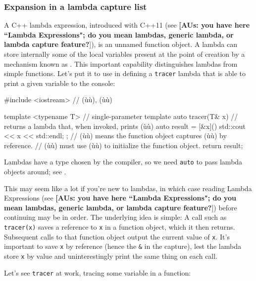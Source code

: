 \subsubsection[Expansion in a lambda capture list]{Expansion in a lambda capture list}\label{expansion-in-a-lambda-capture-list}

A C++ lambda expression, introduced with C++11 (see \featureref{}{}\textbf{[AUs: you have here ``Lambda
Expressions"; do you mean lambdas, generic lambda, or lambda capture feature?}]), is an unnamed function object. A lambda can store
internally some of the local variables present at the point of creation
by a mechanism known as . This important
capability distinguishes lambdas from simple functions. Let's put it to
use in defining a \lstinline!tracer! lambda that is able to print a given
variable to the console:

\begin{emcppslisting}
#include <iostream>  // (ù{}ù), (ù{}ù)

template <typename T>  // single-parameter template
auto tracer(T& x)      // returns a lambda that, when invoked, prints (ù{}ù)
{
    auto result = [&x]() { std::cout << x << std::endl; };
        // (ù{\codeincomments{[\&x]}}ù) means the function object captures (ù{}ù) by reference.
        // (ù{}ù) must use (ù{}ù) to initialize the function object.
    return result;
}
\end{emcppslisting}
    

\noindent Lambdas have a type chosen by the compiler, so we need \lstinline!auto! to
pass lambda objects around; see .

This may seem like a lot if you're new to lambdas, in which case reading
Lambda Expressions (see \featureref{}{}\textbf{[AUs: you have here ``Lambda
Expressions"; do you mean lambdas, generic lambda, or lambda capture feature?}]) before continuing may be in order. The
underlying idea is simple: A call such as \lstinline!tracer(x)! saves a
reference to \lstinline!x! in a function object, which it then returns.
Subsequent calls to that function object output the current value of
\lstinline!x!. It's important to save \lstinline!x! by reference (hence the
\lstinline!&! in the capture), lest the lambda store \lstinline!x! by value
and uninterestingly print the same thing on each call.

Let's see \lstinline!tracer! at work, tracing some variable in a function:

